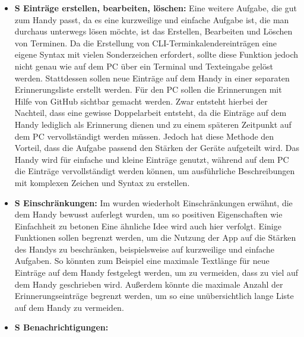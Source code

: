\begin{itemize}
	\item \textbf{S Einträge erstellen, bearbeiten, löschen:} %
		Eine weitere Aufgabe, die gut zum Handy passt, da es eine kurzweilige und einfache Aufgabe ist, die man durchaus unterwegs lösen möchte, ist das Erstellen, Bearbeiten und Löschen von Terminen. %
		Da die Erstellung von CLI-Terminkalendereinträgen eine eigene Syntax mit vielen Sonderzeichen erfordert, sollte diese Funktion jedoch nicht genau wie auf dem PC über ein Terminal und Texteingabe gelöst werden. %
		Stattdessen sollen neue Einträge auf dem Handy in einer separaten Erinnerungsliste erstellt werden. Für den PC sollen die Erinnerungen mit Hilfe von GitHub sichtbar gemacht werden. %
			Zwar entsteht hierbei der Nachteil, dass eine gewisse Doppelarbeit entsteht, da die Einträge auf dem Handy lediglich als Erinnerung dienen und zu einem späteren Zeitpunkt auf dem PC vervollständigt werden müssen. %
			Jedoch hat diese Methode den Vorteil, dass die Aufgabe passend den Stärken der Geräte aufgeteilt wird. Das Handy wird für einfache und kleine Einträge genutzt, während auf dem PC die Einträge vervollständigt werden können, um ausführliche Beschreibungen mit komplexen Zeichen und Syntax zu erstellen.%
	\item \textbf{S Einschränkungen:}	%
		Im  wurden wiederholt Einschränkungen erwähnt, die dem Handy bewusst auferlegt wurden, um so positiven Eigenschaften wie Einfachheit zu betonen %
		Eine ähnliche Idee wird auch hier verfolgt. Einige Funktionen sollen begrenzt werden, um die Nutzung der App auf die Stärken des Handys zu beschränken, beispielsweise auf kurzweilige und einfache Aufgaben. %
		So könnten zum Beispiel eine maximale Textlänge für neue Einträge auf dem Handy festgelegt werden, um zu vermeiden, dass zu viel auf dem Handy geschrieben wird. Außerdem könnte die maximale Anzahl der Erinnerungseinträge begrenzt werden, um so eine unübersichtlich lange Liste auf dem Handy zu vermeiden. %
	\item \textbf{S Benachrichtigungen:} %

\end{itemize}
